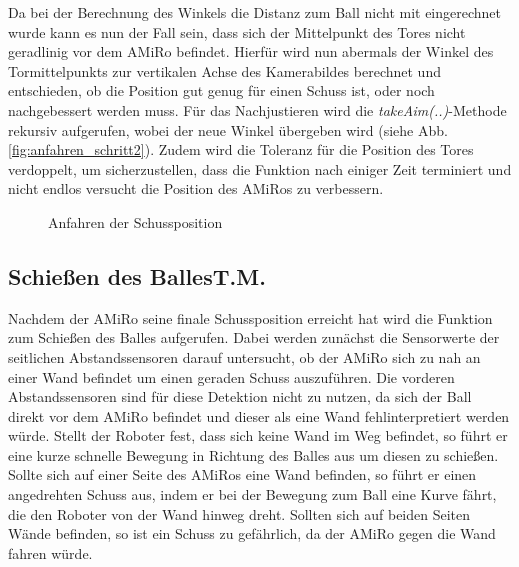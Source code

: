 Da bei der Berechnung des Winkels die Distanz zum Ball nicht mit eingerechnet wurde kann es nun der Fall sein, dass sich der Mittelpunkt des Tores nicht geradlinig vor dem AMiRo befindet. Hierfür wird nun abermals der Winkel des Tormittelpunkts zur vertikalen Achse des Kamerabildes berechnet und entschieden, ob die Position gut genug für einen Schuss ist, oder noch nachgebessert werden muss. 
Für das Nachjustieren wird die \textit{takeAim(..)}-Methode rekursiv aufgerufen, wobei der neue Winkel übergeben wird (siehe Abb. \ref{fig:anfahren_schritt2}). Zudem wird die Toleranz für die Position des Tores verdoppelt, um sicherzustellen, dass die Funktion nach einiger Zeit terminiert und nicht endlos versucht die Position des AMiRos zu verbessern.

\begin{figure} []
	\caption{Anfahren der Schussposition} 
	\label{fig:anfahren}
\end{figure} 


\subsection[Schießen des Balles]{Schießen des Balles\hfill {\normalsize T.M.}} %

Nachdem der AMiRo seine finale Schussposition erreicht hat wird die Funktion zum Schießen des Balles aufgerufen. Dabei werden zunächst die Sensorwerte der seitlichen Abstandssensoren darauf untersucht, ob der AMiRo sich zu nah an einer Wand befindet um einen geraden Schuss auszuführen. Die vorderen Abstandssensoren sind für diese Detektion nicht zu nutzen, da sich der Ball direkt vor dem AMiRo befindet und dieser als eine Wand fehlinterpretiert werden würde. 
Stellt der Roboter fest, dass sich keine Wand im Weg befindet, so führt er eine kurze schnelle Bewegung in Richtung des Balles aus um diesen zu schießen.
Sollte sich auf einer Seite des AMiRos eine Wand befinden, so führt er einen angedrehten Schuss aus, indem er bei der Bewegung zum Ball eine Kurve fährt, die den Roboter von der Wand hinweg dreht. 
Sollten sich auf beiden Seiten Wände befinden, so ist ein Schuss zu gefährlich, da der AMiRo gegen die Wand fahren würde.

